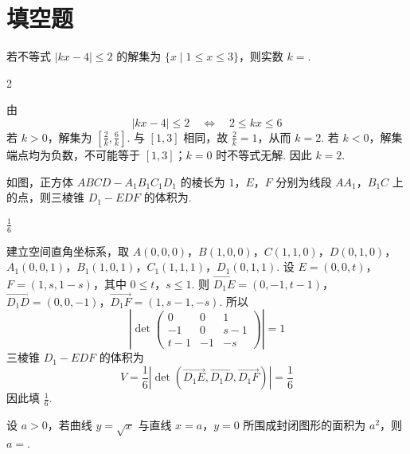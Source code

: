\section{填空题}

\begin{problem}
若不等式 \(|kx - 4| \leqslant 2\) 的解集为 \(\{x \mid 1 \leqslant x \leqslant 3\}\)，则实数 \(k = \)\fillinblank{}.
\end{problem}

\begin{answer}
2
\end{answer}

\begin{solution}
由
\[
|kx-4|\leqslant2
\quad\Longleftrightarrow\quad
2\leqslant kx\leqslant6
\]
若 \(k>0\)，解集为 \(\left[\frac2k,\frac6k\right]\). 与 \([1,3]\) 相同，故 \(\frac2k=1\)，从而 \(k=2\). 若 \(k<0\)，解集端点均为负数，不可能等于 \([1,3]\)；\(k=0\) 时不等式无解. 因此 \(k=2\).
\end{solution}

\begin{problem}
如图，正方体 \(ABCD - A_{1}B_{1}C_{1}D_{1}\) 的棱长为 \(1\)，\(E\)，\(F\) 分别为线段 \(AA_{1}\)，\(B_{1}C\) 上的点，则三棱锥 \(D_{1} - EDF\) 的体积为\fillinblank{}.

\end{problem}

\begin{answer}
\(\frac{1}{6}\)
\end{answer}

\begin{solution}
建立空间直角坐标系，取
\(A(0,0,0)\)，\(B(1,0,0)\)，\(C(1,1,0)\)，\(D(0,1,0)\)，
\(A_1(0,0,1)\)，\(B_1(1,0,1)\)，\(C_1(1,1,1)\)，\(D_1(0,1,1)\).
设 \(E=(0,0,t)\)，\(F=(1,s,1-s)\)，其中 \(0\leqslant t\)，\(s\leqslant1\). 则
\(\overrightarrow{D_1E}=(0,-1,t-1)\)，\(\overrightarrow{D_1D}=(0,0,-1)\)，\(\overrightarrow{D_1F}=(1,s-1,-s)\).
所以
\[
\left|\det\begin{pmatrix}
0&0&1\\
-1&0&s-1\\
t-1&-1&-s
\end{pmatrix}\right|=1
\]
三棱锥 \(D_1-EDF\) 的体积为
\[
V=\frac16\left|\det\left(\overrightarrow{D_1E},
\overrightarrow{D_1D},\overrightarrow{D_1F}\right)\right|
=\frac16
\]
因此填 \(\frac16\).
\end{solution}

\begin{problem}
设 \(a > 0\)，若曲线 \(y = \sqrt{x}\) 与直线 \(x = a\)，\(y = 0\) 所围成封闭图形的面积为 \(a^2\)，则 \(a = \)\fillinblank{}.
\end{problem}

